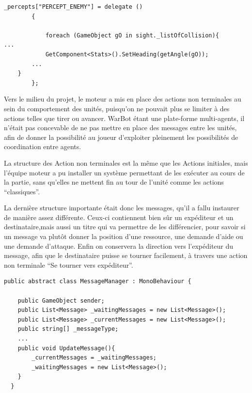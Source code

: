 \documentclass{report}
\begin{document}
\begin{lstlisting}[frame=single]
_percepts["PERCEPT_ENEMY"] = delegate ()
        {
            
            foreach (GameObject gO in sight._listOfCollision){
...
            GetComponent<Stats>().SetHeading(getAngle(gO));
        ...
    }
        };
\end{lstlisting}

Vers le milieu du projet, le moteur a mis en place des actions non terminales au sein du comportement des unités, puisqu’on ne pouvait plus se limiter à des actions telles que tirer ou avancer. 
WarBot étant une plate-forme multi-agents, il n’était pas concevable de ne pas mettre en place des messages entre les unités, afin de donner la possibilité au joueur d’exploiter pleinement les possibilités de coordination entre agents.

La structure des Action non terminales est la même que les Actions initiales, mais l’équipe moteur a pu installer un système permettant de les exécuter au cours de la partie, sans qu’elles ne mettent fin au tour de l’unité comme les actions “classiques”.


La dernière structure importante était donc les messages, qu’il a fallu instaurer de manière assez différente.
Ceux-ci contiennent bien sûr un expéditeur et un destinataire,mais aussi un titre qui va permettre de les différencier, pour savoir si un message va plutôt donner la position d’une ressource, une demande d’aide ou une demande d’attaque. Enfin on conservera la direction vers l’expéditeur du message, afin que le destinataire puisse se tourner facilement, à travers une action non terminale “Se tourner vers expéditeur”.

\begin{lstlisting}[frame=single]
public abstract class MessageManager : MonoBehaviour {

    public GameObject sender;
    public List<Message> _waitingMessages = new List<Message>();
    public List<Message> _currentMessages = new List<Message>();
    public string[] _messageType;
    ...
    public void UpdateMessage(){
        _currentMessages = _waitingMessages;
        _waitingMessages = new List<Message>();
    }
  }    
\end{lstlisting}
\end{document}
